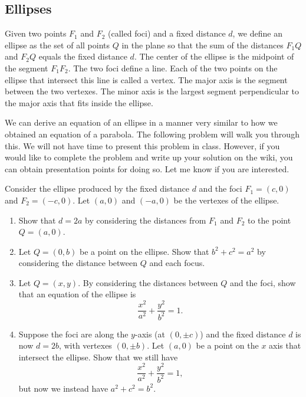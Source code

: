\subsection{Ellipses}

\begin{definition}
Given two points $F_1$ and $F_2$ (called foci) and a fixed distance $d$, we define an ellipse as the set of all points $Q$ in the plane so that the sum of the distances $F_1Q$  and $F_2Q$ equals the fixed distance $d$. The center of the ellipse is the midpoint of the segment $F_1F_2$. The two foci define a line.  Each of the two points on the ellipse that intersect this line is called a vertex. The major axis is the segment between the two vertexes. The minor axis is the largest segment perpendicular to the major axis that fits inside the ellipse.
\end{definition}

We can derive an equation of an ellipse in a manner very similar to how we obtained an equation of a parabola.  The following problem will walk you through this.  We will not have time to present this problem in class. However, if you would like to complete the problem and write up your solution on the wiki, you can obtain presentation points for doing so.  Let me know if you are interested. 

\begin{problem}[Optional]
Consider the ellipse produced by the fixed distance $d$ and the foci $F_1=(c,0)$ and $F_2=(-c,0)$. Let $(a,0)$ and $(-a,0)$ be the vertexes of the ellipse.
\begin{enumerate}
\item Show that $d=2a$ by considering the distances from $F_1$ and $F_2$ to the point $Q=(a,0)$.
\item Let $Q=(0,b)$ be a point on the ellipse.  Show that $b^2+c^2=a^2$ by considering the distance between $Q$ and each focus.
\item Let $Q=(x,y)$. By considering the distances between $Q$ and the foci, show that an equation of the ellipse is $$\frac{x^2}{a^2}+\frac{y^2}{b^2}=1.$$
\item Suppose the foci are along the $y$-axis (at $(0,\pm c)$) and the fixed distance $d$ is now $d=2b$, with vertexes $(0,\pm b)$. Let $(a,0)$ be a point on the $x$ axis that intersect the ellipse.  Show that we still have $$\frac{x^2}{a^2}+\frac{y^2}{b^2}=1,$$ but now we instead have $a^2+c^2=b^2$.
\end{enumerate}
\end{problem}

